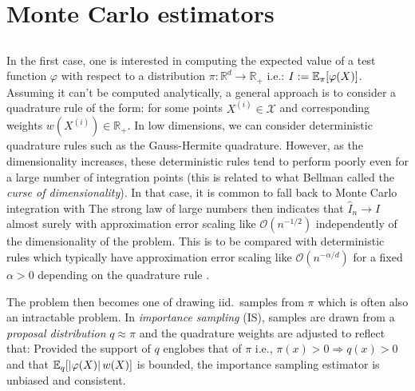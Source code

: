 
\section{Monte Carlo estimators}

\subsection{}

In the first case, one is interested in computing the expected value of a test function $\varphi$ with respect to a distribution $\pi:\mathbb R^{d} \to \mathbb R_+$ i.e.: $I:=\mathbb E_\pi[\varphi(X)]$. Assuming it can't be computed analytically, a general approach is to consider a quadrature rule of the form:
%
%
for some points $X^{(i)}\in\mathcal X$ and corresponding weights $w(X^{(i)})\in\mathbb R_+$. In low dimensions, we can consider deterministic quadrature rules such as the Gauss-Hermite quadrature. However, as the dimensionality increases, these deterministic rules tend to perform poorly even for a large number of integration points (this is related to what Bellman called the \emph{curse of dimensionality}). In that case, it is common to fall back to Monte Carlo integration with
%
%
The strong law of large numbers then indicates that $\widehat I_n\to I$ almost surely with approximation error scaling like $\mathcal O(n^{-1/2})$ independently of the dimensionality of the problem. This is to be compared with deterministic rules which typically have approximation error scaling like $\mathcal O(n^{-\alpha/d})$ for a fixed $\alpha>0$ depending on the quadrature rule \citep{caflisch98}.

The problem then becomes one of drawing iid.\ samples from $\pi$ which is often also an intractable problem. In \emph{importance sampling} (IS), samples are drawn from a \emph{proposal distribution} $q\approx \pi$ and the quadrature weights are adjusted to reflect that:
%
%
Provided the support of $q$ englobes that of $\pi$ i.e., $\pi(x)>0\Rightarrow q(x)>0$ and that $\mathbb E_q[\left|\varphi(X)\right|w(X)]$ is bounded, the importance sampling estimator is unbiased and consistent.


